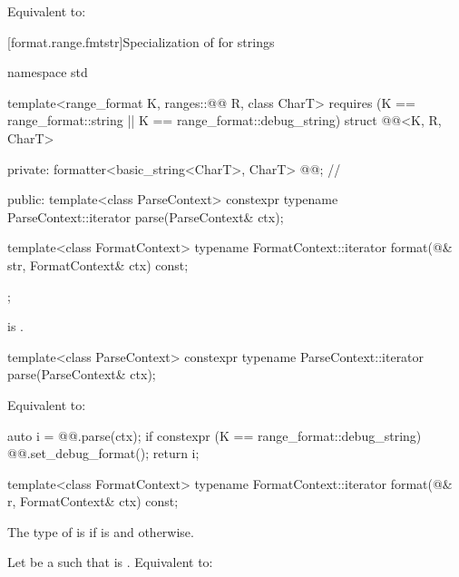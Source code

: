 \begin{itemdescr}
\pnum
\effects
Equivalent to: 
\end{itemdescr}

[format.range.fmtstr]{Specialization of  for strings}

%
\begin{codeblock}
namespace std {
  template<range_format K, ranges::@@ R, class CharT>
    requires (K == range_format::string || K == range_format::debug_string)
  struct @@<K, R, CharT> {
  private:
    formatter<basic_string<CharT>, CharT> @@;                  // \expos

  public:
    template<class ParseContext>
      constexpr typename ParseContext::iterator
        parse(ParseContext& ctx);

    template<class FormatContext>
      typename FormatContext::iterator
        format(@\seebelow@& str, FormatContext& ctx) const;
  };
}
\end{codeblock}

\pnum
\mandates
{}
is .

%
\begin{itemdecl}
template<class ParseContext>
  constexpr typename ParseContext::iterator
    parse(ParseContext& ctx);
\end{itemdecl}

\begin{itemdescr}
\pnum
\effects
Equivalent to:
\begin{codeblock}
auto i = @@.parse(ctx);
if constexpr (K == range_format::debug_string) {
  @@.set_debug_format();
}
return i;
\end{codeblock}
\end{itemdescr}

%
\begin{itemdecl}
template<class FormatContext>
  typename FormatContext::iterator
    format(@\seebelow@& r, FormatContext& ctx) const;
\end{itemdecl}

\begin{itemdescr}
\pnum
The type of  is 
if  is  and
 otherwise.

\pnum
\effects
Let  be a  such that
 is .
Equivalent to: 
\end{itemdescr}

